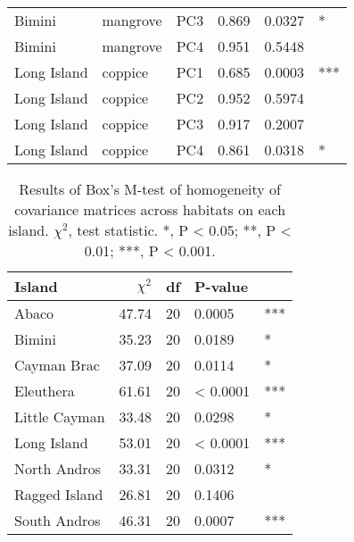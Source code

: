\begin{table}[H]
\begin{tabular}{lllrll}
        Bimini & mangrove & PC3 & 0.869 & 0.0327 & *\\
        Bimini & mangrove & PC4 & 0.951 & 0.5448 & \\
        Long Island & coppice & PC1 & 0.685 & 0.0003 & ***\\
        Long Island & coppice & PC2 & 0.952 & 0.5974 & \\
        Long Island & coppice & PC3 & 0.917 & 0.2007 & \\
        Long Island & coppice & PC4 & 0.861 & 0.0318 & *\\
        \hline
    \end{tabular}
    \label{suptab:normality}
\end{table}

\begin{table}[H]
    \caption{Results of Box's M-test of homogeneity of covariance matrices across habitats on each island. $\chi^2$, test statistic. *, P < 0.05; **, P < 0.01; ***, P < 0.001.}
    \centering
    \begin{tabular}{lrrll}
        \hline
        Island & $\chi^2$ & df & P-value & \\
        \hline
        Abaco & 47.74 & 20 & 0.0005 & ***\\
        Bimini & 35.23 & 20 & 0.0189 & *\\
        Cayman Brac & 37.09 & 20 & 0.0114 & *\\
        Eleuthera & 61.61 & 20 & < 0.0001 & ***\\
        Little Cayman & 33.48 & 20 & 0.0298 & *\\
        Long Island & 53.01 & 20 & < 0.0001 & ***\\
        North Andros & 33.31 & 20 & 0.0312 & *\\
        Ragged Island & 26.81 & 20 & 0.1406 & \\
        South Andros & 46.31 & 20 & 0.0007 & ***\\
        \hline
    \end{tabular}
    \label{suptab:covariances}
\end{table}

